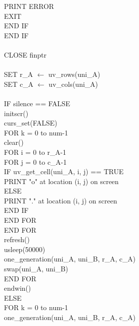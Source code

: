 \documentclass[12pt]{article}
\begin{document}
\indent \indent \indent PRINT ERROR \\
\indent \indent \indent EXIT \\
\indent \indent END IF \\
\indent END IF \\
\\
\indent CLOSE finptr \\
\\
\indent SET r\_A $\leftarrow$ uv\_rows(uni\_A) \\
\indent SET c\_A $\leftarrow$ uv\_cols(uni\_A) \\
\\
\indent IF silence == FALSE \\
\indent \indent initscr() \\
\indent \indent curs\_set(FALSE) \\
\indent \indent FOR k = 0 to num-1 \\
\indent \indent \indent clear() \\
\indent \indent \indent FOR i = 0 to r\_A-1 \\
\indent \indent \indent \indent FOR j = 0 to c\_A-1 \\
\indent \indent \indent \indent \indent IF uv\_get\_cell(uni\_A, i, j) == TRUE \\
\indent \indent \indent \indent \indent \indent PRINT "o" at location (i, j) on screen \\
\indent \indent \indent \indent \indent ELSE \\
\indent \indent \indent \indent \indent \indent PRINT "." at location (i, j) on screen \\
\indent \indent \indent \indent \indent END IF \\
\indent \indent \indent \indent END FOR \\
\indent \indent \indent END FOR \\
\indent \indent \indent refresh() \\
\indent \indent \indent usleep(50000) \\
\indent \indent \indent one\_generation(uni\_A, uni\_B, r\_A, c\_A) \\
\indent \indent \indent swap(uni\_A, uni\_B) \\
\indent \indent END FOR \\
\indent \indent endwin() \\
\indent ELSE \\
\indent \indent FOR k = 0 to num-1 \\
\indent \indent \indent one\_generation(uni\_A, uni\_B, r\_A, c\_A) \\
\end{document}
